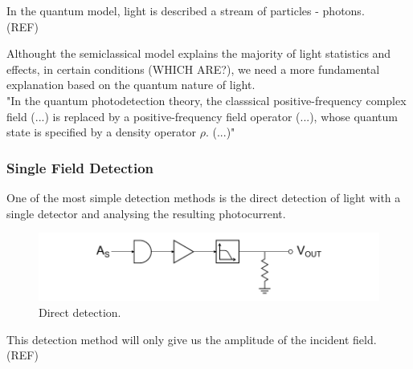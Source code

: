 \begin{bibunit}[plain]

In the quantum model, light is described a stream of particles - photons.\\
(REF)

Althought the semiclassical model explains the majority of light statistics and effects, in certain conditions (WHICH ARE?), we need a more fundamental explanation based on  the quantum nature of light.\\

"In the quantum photodetection theory, the classsical positive-frequency complex field (...) is replaced by a positive-frequency field operator (...), whose quantum state is specified by a density operator $\rho$. (...)"\\
\cite{shapiro1985quantum} %






\subsubsection{Single Field Detection}

One of the most simple detection methods is the direct detection of light with a single detector and analysing the resulting photocurrent.
\cite{hans2004} %
%
\begin{figure}[H]
	\label{fig:detection_direct}
	\centering
	\includegraphics{./sdf/optical_detection/figures/detection-direct.pdf}
	\caption{Direct detection.}
\end{figure}


This detection method will only give us the amplitude of the incident field. (REF)\\



\end{bibunit}
